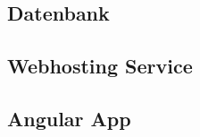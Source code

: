 \subsection{Datenbank}
    \lipsum[5-12]
\subsection{Webhosting Service}
    \lipsum[5-12]
\subsection{Angular App}
    \lipsum[5-12]
